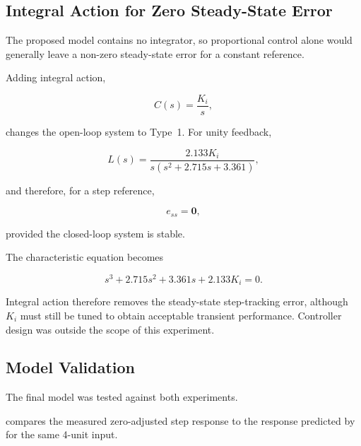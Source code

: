 \documentclass[12pt,a4paper]{article}
\begin{document}
\newpage

\subsection{Integral Action for Zero Steady-State Error}

The proposed model contains no integrator, so proportional control
alone would generally leave a non-zero steady-state error for a
constant reference.

Adding integral action,

\begin{equation}
    C(s)=\frac{K_i}{s},
    \tag{44}
\end{equation}

changes the open-loop system to Type~1. For unity feedback,

\begin{equation}
    L(s)
    =
    \frac{2.133K_i}
    {s\left(s^2+2.715s+3.361\right)},
    \tag{45}
\end{equation}

and therefore, for a step reference,

\begin{equation}
    e_{ss}
    =
    \boxed{\mathbf{0}},
    \tag{46}
\end{equation}

provided the closed-loop system is stable.

The characteristic equation becomes

\begin{equation}
    s^3+2.715s^2+3.361s+2.133K_i=0.
    \tag{47}
\end{equation}

Integral action therefore removes the steady-state step-tracking
error, although $K_i$ must still be tuned to obtain acceptable
transient performance. Controller design was outside the scope of
this experiment.


\subsection{Model Validation}

The final model was tested against both experiments.

 compares the measured zero-adjusted step
response to the response predicted by  for the
same 4-unit input.
\end{document}
